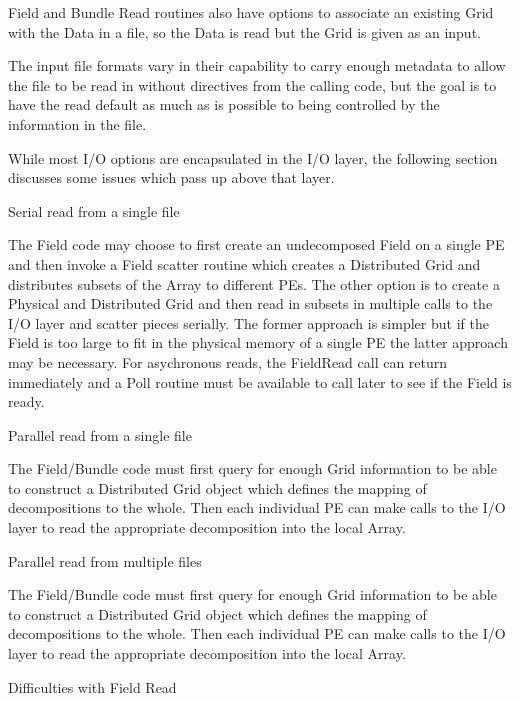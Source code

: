 \begin{description}
Field and Bundle Read routines also have options to associate
an existing Grid with the Data in a file, so the Data is
read but the Grid is given as an input.

The input file formats vary in their capability to
carry enough metadata to allow the file to be read
in without directives from the calling code, but the
goal is to have the read default as much as is possible
to being controlled by the information in the file.

While most I/O options are encapsulated in the I/O layer,
the following section discusses some issues which pass
up above that layer.

\begin{description}

\item{Serial read from a single file}

The Field code may choose to first create an
undecomposed Field on a single PE and then invoke a
Field scatter routine which creates a Distributed Grid
and distributes subsets of the Array to different PEs.
The other option is to create a Physical and Distributed
Grid and then read in subsets in multiple calls to the
I/O layer and scatter pieces serially.  The former approach
is simpler but if the Field is too large to fit in the
physical memory of a single PE the latter approach may be
necessary.  For asychronous reads, the FieldRead call can
return immediately and a Poll routine must be available to
call later to see if the Field is ready.

\item{Parallel read from a single file}

The Field/Bundle code must first query for enough
Grid information to be able to construct a Distributed
Grid object which defines the mapping of decompositions
to the whole.  Then each individual PE can make calls
to the I/O layer to read the appropriate decomposition
into the local Array.  

\item{Parallel read from multiple files}

The Field/Bundle code must first query for enough
Grid information to be able to construct a Distributed
Grid object which defines the mapping of decompositions
to the whole.  Then each individual PE can make calls
to the I/O layer to read the appropriate decomposition
into the local Array.  

\item{Difficulties with Field Read}


\end{description}
\end{description}
